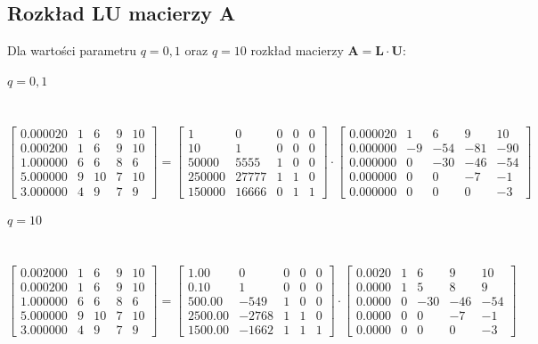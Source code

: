 \documentclass[a4paper]{article}
\begin{document}
\subsection{Rozkład LU macierzy A}
Dla wartości parametru $q = 0,1$ oraz $q = 10$ rozkład macierzy $\textbf{A} = \textbf{L} \cdot \textbf{U}$:
\subparagraph{$ q = 0,1 $} \hfill \\
$$
\left[
\begin{array}{ccccc}
0.000020&1&6&9&10\\ 
0.000200&1&6&9&10\\ 
1.000000&6&6&8&6\\ 
5.000000&9&10&7&10\\ 
3.000000&4&9&7&9
\end{array}
\right]
=
\left[
\begin{array}{ccccc}
1&0&0&0&0\\ 
10&1&0&0&0\\ 
50000&5555&1&0&0\\ 
250000&27777&1&1&0\\ 
150000&16666&0&1&1
\end{array}
\right]
\cdot
\left[
\begin{array}{ccccc}
0.000020&1&6&9&10\\ 
0.000000&-9&-54&-81&-90\\ 
0.000000&0&-30&-46&-54\\ 
0.000000&0&0&-7&-1\\ 
0.000000&0&0&0&-3
\end{array}
\right]
$$
\subparagraph{$ q = 10 $} \hfill \\
$$
\left[
\begin{array}{ccccc}
0.002000&1&6&9&10\\ 
0.000200&1&6&9&10\\ 
1.000000&6&6&8&6\\ 
5.000000&9&10&7&10\\ 
3.000000&4&9&7&9
\end{array}
\right]
=
\left[
\begin{array}{ccccc}
1.00&0&0&0&0\\ 
0.10&1&0&0&0\\ 
500.00&-549&1&0&0\\ 
2500.00&-2768&1&1&0\\ 
1500.00&-1662&1&1&1
\end{array}
\right]
\cdot
\left[
\begin{array}{ccccc}
0.0020&1&6&9&10\\ 
0.0000&1&5&8&9\\ 
0.0000&0&-30&-46&-54\\ 
0.0000&0&0&-7&-1\\ 
0.0000&0&0&0&-3
\end{array}
\right]
$$
\end{document}
